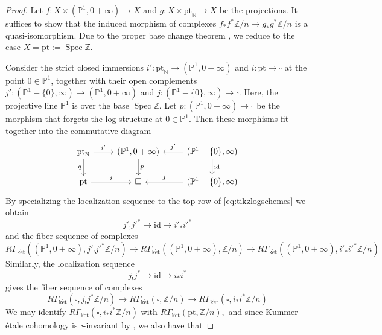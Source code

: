 \documentclass[10pt]{amsart}
\newcommand{\N}{\mathbb{N}}
\renewcommand{\P}{\mathbb{P}}
\newcommand{\Z}{\mathbb{Z}}
\DeclareMathOperator{\Spec}{Spec}
\newcommand{\id}{\mathrm{id}}
\newcommand{\ket}{\mathrm{k\acute{e}t}}
\newcommand{\pt}{\mathrm{pt}}
\begin{document}
\begin{proof}
Let $f\colon X\times (\P^1,0+\infty)\to X$ and $g\colon X\times \pt_\N \to X$ be the projections.
It suffices to show that the induced morphism of complexes $f_*f^*\Z/n\to g_*g^*\Z/n$ is a quasi-isomorphism.
Due to the proper base change theorem \cite[Theorem 5.1]{MR1457738},
we reduce to the case $X=\pt:=\Spec{\Z}$.

Consider the strict closed immersions 
$i' \colon \pt_{\N} \to (\P^1, 0+\infty)$ and $i \colon \pt \to \square$ at the point $0 \in \P^1$, 
together with their open complements $j' \colon (\P^1-\{0\}, \infty) \to (\P^1, 0+\infty)$ and $j \colon  (\P^1-\{0\}, \infty) \to \square.$ 
Here, the projective line $\P^1$ is over the base $\Spec{\Z}$.
Let $p \colon (\P^1, 0+\infty) \to \square$ be the morphism that forgets the log structure at $0 \in \P^1.$ Then these morphisms fit together into the commutative diagram
\begin{equation}
\label{eq:tikzlogschemes}
\begin{tikzcd}
\pt_\N \ar[r, "i'"] \ar[d, "q"'] & (\P^1,0+\infty) \ar[d, "p"] & \ar[l, "j'" above] (\P^1-\{0\},\infty) \ar[d,"\id"]
\\
\pt \ar[r, "i"] & \square & \ar[l, "j" above] (\P^1-\{0\},\infty)
\end{tikzcd}
\end{equation}
By specializing the localization sequence 
\cite[§2.8(4)]{MR1457738} to the top row of \eqref{eq:tikzlogschemes} 
we obtain
\begin{equation}\label{eq:localiationsequence}
j'_!j'^* \to \id \to i'_*i'^*
\end{equation}
and the fiber sequence of complexes
\begin{equation}
\label{eq:toprowlocalizationsequence}
R\Gamma_{\ket}((\P^1,0+\infty),j'_!j'^*\Z/n)
\to
R\Gamma_{\ket}((\P^1,0+\infty),\Z/n)
\to
R\Gamma_{\ket}((\P^1,0+\infty),i'_*i'^*\Z/n)
\end{equation}
Similarly, the localization sequence 
\begin{equation}
j_!j^* \to \id \to i_*i^*
\end{equation}
gives the fiber sequence of complexes
\begin{equation}\label{eq:bottomrowlocalizationsequence}
R\Gamma_{\ket}(\square,j_!j^*\Z/n)
\to
R\Gamma_{\ket}(\square,\Z/n)
\to
R\Gamma_{\ket}(\square,i_*i^*\Z/n)
\end{equation}
We may identify $R\Gamma_{\ket}(\square,i_*i^*\Z/n)$ with $R\Gamma_{\ket}(\pt,\Z/n),$ and 
since Kummer étale cohomology is $\square$-invariant by \cite[Theorem 9.1.5]{logSH}, we also have that

\end{proof}
\end{document}
